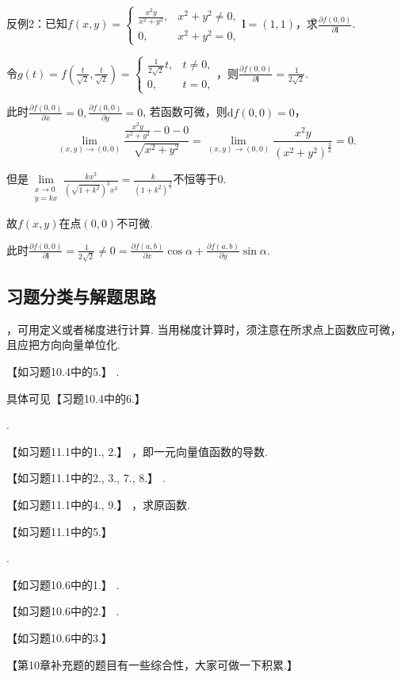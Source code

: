 \documentclass[12pt,UTF8]{ctexart}
\newcommand{\md}[0]{\mathrm d}
\begin{document}
\begin{enumerate}
反例2：已知$f(x,y)=\begin{cases}
\frac{x^2y}{x^2+y^2},&x^2+y^2\neq0,\\
0,&x^2+y^2=0,
\end{cases}\bm l=(1,1)$，求$\frac{\partial f(0,0)}{\partial\bm l}$.

令$g(t)=f(\frac t{\sqrt 2},\frac t{\sqrt2})=\begin{cases}
\frac1{2\sqrt2}t,&t\neq0,\\
0,&t=0,
\end{cases}$，则$\frac{\partial f(0,0)}{\partial\bm l}=\frac1{2\sqrt2}$.

此时$\frac{\partial f(0,0)}{\partial x}=0,\frac{\partial f(0,0)}{\partial y}=0$,
若函数可微，则$\md f(0,0)=0$，
\[\lim\limits_{(x,y)\rightarrow(0,0)}\frac{\frac{x^2y}{x^2+y^2}-0-0}{\sqrt{x^2+y^2}}=\lim\limits_{(x,y)\rightarrow(0,0)}\frac{x^2y}{(x^2+y^2)^{\frac32}}=0.\]

但是$\lim\limits_{\substack{x\rightarrow0\\ y=kx}}\frac{kx^3}{(\sqrt{1+k^2})^3x^3}=\frac k{(1+k^2)^{\frac32}}$不恒等于0.

故$f(x,y)$在点$(0,0)$不可微.

此时$\frac{\partial f(0,0)}{\partial\bm l}=\frac1{2\sqrt2}\neq0=\frac{\partial f(a,b)}{\partial x}\cos\alpha+\frac{\partial f(a,b)}{\partial y}\sin\alpha$.
\end{enumerate}
\subsection{习题分类与解题思路}
\begin{enumerate}
\begin{enumerate}
，可用定义或者梯度进行计算. 当用梯度计算时，须注意在所求点上函数应可微，且应把方向向量单位化.

【如习题10.4中的5.】
. 

具体可见【习题10.4中的6.】
\end{enumerate}
\begin{enumerate}
.

【如习题11.1中的1., 2.】
，即一元向量值函数的导数.

【如习题11.1中的2., 3., 7., 8.】
.

【如习题11.1中的4., 9.】
，求原函数.

【如习题11.1中的5.】
\end{enumerate}
\begin{enumerate}
.

【如习题10.6中的1.】
.

【如习题10.6中的2.】
.

【如习题10.6中的3.】
\end{enumerate}
\end{enumerate}
【第10章补充题的题目有一些综合性，大家可做一下积累.】
\end{document}
